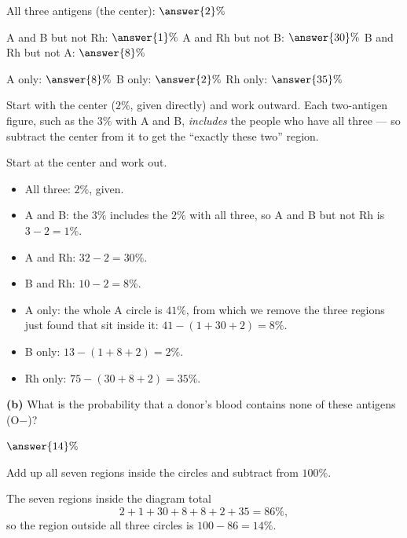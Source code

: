 \documentclass[12pt]{ximera}
\begin{document}
\begin{problem}
\begin{prompt}
All three antigens (the center): $\answer{2}\%$

\smallskip
A and B but not Rh: $\answer{1}\%$ \qquad
A and Rh but not B: $\answer{30}\%$ \qquad
B and Rh but not A: $\answer{8}\%$

\smallskip
A only: $\answer{8}\%$ \qquad
B only: $\answer{2}\%$ \qquad
Rh only: $\answer{35}\%$

\begin{hint}
Start with the center ($2\%$, given directly) and work outward. Each two-antigen
figure, such as the $3\%$ with A and B, \emph{includes} the people who have all
three --- so subtract the center from it to get the ``exactly these two'' region.
\end{hint}

\begin{feedback}
Start at the center and work out.
\begin{itemize}
\item All three: $2\%$, given.
\item A and B: the $3\%$ includes the $2\%$ with all three, so A and B but not Rh is
      $3-2=1\%$.
\item A and Rh: $32-2=30\%$.
\item B and Rh: $10-2=8\%$.
\item A only: the whole A circle is $41\%$, from which we remove the three regions
      just found that sit inside it: $41-(1+30+2)=8\%$.
\item B only: $13-(1+8+2)=2\%$.
\item Rh only: $75-(30+8+2)=35\%$.
\end{itemize}
\end{feedback}
\end{prompt}

\begin{prompt}
\textbf{(b)} What is the probability that a donor's blood contains none of these
antigens (O$-$)?

$\answer{14}\%$

\begin{hint}
Add up all seven regions inside the circles and subtract from $100\%$.
\end{hint}

\begin{feedback}
The seven regions inside the diagram total
\[ 2+1+30+8+8+2+35 = 86\%, \]
so the region outside all three circles is $100-86=14\%$.
\end{feedback}
\end{prompt}


\end{problem}
\end{document}
